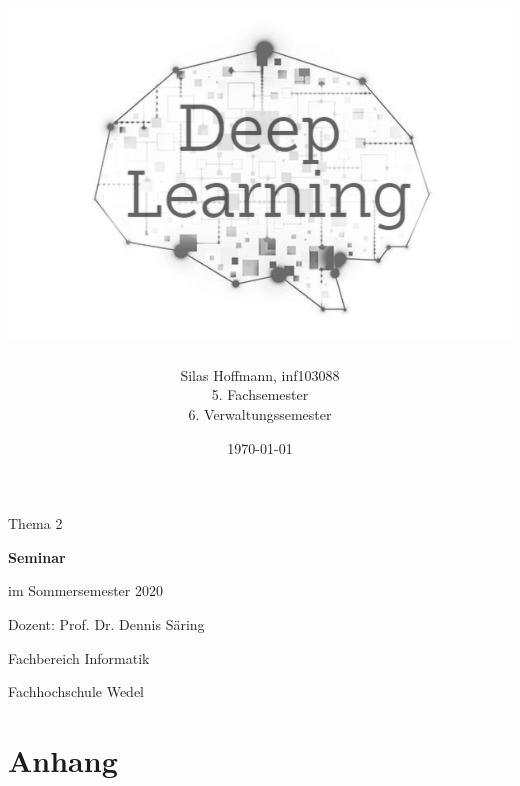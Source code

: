 \documentclass[a4paper, 11pt]{scrartcl}
\title{\includegraphics[width=\linewidth]{img/dl_logo}}
\author{Silas Hoffmann, inf103088
\normalsize
\\5. Fachsemester
\\6. Verwaltungssemester}
\date{\today}
\begin{document}
\maketitle

\vfill
\begin{center}
	Thema 2
	
	\vspace{0.5cm}
	\Large
	\textbf{Seminar}
	\normalsize
	
	\vspace{0.3cm}
	im Sommersemester 2020
	
	\vspace{0.5cm}
	Dozent: Prof. Dr. Dennis Säring
	
	\vfill
	\small
	Fachbereich Informatik
	
	\vspace{0.3cm}
	Fachhochschule Wedel
\end{center}
\thispagestyle{empty}
\restoregeometry

\newpage
\pagestyle{plain}
\tableofcontents
\newpage
% 
\listoffigures
\newpage

\pagestyle{fancy}





\clearpage


\clearpage


 
\clearpage
\appendix
{}
\thispagestyle{plain}

\nocite{*} 




\clearpage
\section{Anhang}

\end{document}

